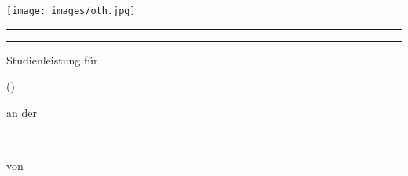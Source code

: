 \begin{titlepage}

\begin{center}

\begin{minipage}[c][][t]{0.48\textwidth}
\begin{flushleft}
	\texttt{[image: images/oth.jpg]}			%
\end{flushleft}
\end{minipage}
\begin{minipage}[c][][t]{0.49\textwidth}
\begin{flushright}
	\vspace {0.5cm}
\end{flushright}
\end{minipage}


\vspace {2cm}

\textsc{\LARGE \module} %

\rule{\linewidth}{0.5mm} %

\vspace {-0.3cm}

\begin{center}
	{\huge \bfseries \thesistitle}%
\end{center}

\vspace {-0.8cm}
\rule{\linewidth}{0.5mm} %

\vspace{1cm}
 
 

Studienleistung für \\

\vspace{0.1cm}

{\Large \masterfach \linebreak (\degree)}\\

\vspace{0.1cm}

an der \\

\vspace{0.1cm}

{\Large \university} \\

 
\vspace{1cm}

von \\ {\LARGE \myname}


\end{center}
\end{titlepage}
